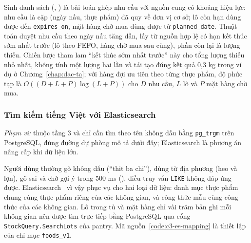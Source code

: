 Sinh danh sách (, ) là bài toán ghép nhu cầu với nguồn cung có khoảng hiệu lực: nhu cầu là cặp (ngày nấu, thực phẩm) đã quy về đơn vị cơ sở; lô còn hạn dùng được đến \texttt{expires\_on}, mặt hàng chờ mua dùng được từ \texttt{planned\_date}. Thuật toán duyệt nhu cầu theo ngày nấu tăng dần, lấy từ nguồn hợp lệ có hạn kết thúc sớm nhất trước (lô theo FEFO, hàng chờ mua sau cùng), phần còn lại là lượng thiếu. Chiến lược tham lam “kết thúc sớm nhất trước” này cho tổng lượng thiếu nhỏ nhất, không tính một lượng hai lần và tái tạo đúng kết quả 0,3 kg trong ví dụ ở Chương~\ref{chap:dac-ta}; với hàng đợi ưu tiên theo từng thực phẩm, độ phức tạp là $O((D + L + P)\log(L + P))$ cho $D$ nhu cầu, $L$ lô và $P$ mặt hàng chờ mua.

\subsubsection{Tìm kiếm tiếng Việt với Elasticsearch}\label{sssec:kt-tim-kiem}

\emph{Phạm vi:}  thuộc tầng 3 và chỉ cần tìm theo tên không dấu bằng \texttt{pg\_trgm} trên PostgreSQL, đúng đường dự phòng mô tả dưới đây; Elasticsearch là phương án nâng cấp khi dữ liệu lớn.

Người dùng thường gõ không dấu (“thit ba chi”), dùng từ địa phương (heo và lợn), gõ sai và chờ gợi ý trong 500 ms (), điều truy vấn \texttt{LIKE} không đáp ứng được. Elasticsearch~\cite{elasticsearch} vì vậy phục vụ  cho hai loại dữ liệu: danh mục thực phẩm chung cùng thực phẩm riêng của các không gian, và công thức mẫu cùng công thức của các không gian. Lô trong tủ và mặt hàng chỉ vài trăm bản ghi mỗi không gian nên được tìm trực tiếp bằng PostgreSQL qua cổng \texttt{StockQuery.SearchLots} của pantry. Mã nguồn~\ref{code:c3-es-mapping} là thiết lập của chỉ mục \texttt{foods\_v1}.

